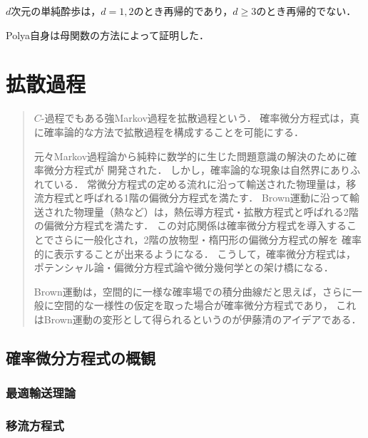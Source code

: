 \documentclass[uplatex,dvipdfmx]{jsreport}
\begin{document}
\begin{theorem}[Polya 1921]
    $d$次元の単純酔歩は，$d=1,2$のとき再帰的であり，$d\ge3$のとき再帰的でない．
\end{theorem}
\begin{history}
    Polya自身は母関数の方法によって証明した．
\end{history}

\chapter{拡散過程}

\begin{quotation}
    $C$-過程でもある強Markov過程を拡散過程という．
    確率微分方程式は，真に確率論的な方法で拡散過程を構成することを可能にする．

    元々Markov過程論から純粋に数学的に生じた問題意識の解決のために確率微分方程式が
    開発された．
    しかし，確率論的な現象は自然界にありふれている．
    常微分方程式の定める流れに沿って輸送された物理量は，移流方程式と呼ばれる1階の偏微分方程式を満たす．
    Brown運動に沿って輸送された物理量（熱など）は，熱伝導方程式・拡散方程式と呼ばれる2階の偏微分方程式を満たす．
    この対応関係は確率微分方程式を導入することでさらに一般化され，2階の放物型・楕円形の偏微分方程式の解を
    確率的に表示することが出来るようになる．
    こうして，確率微分方程式は，ポテンシャル論・偏微分方程式論や微分幾何学との架け橋になる．

    Brown運動は，空間的に一様な確率場での積分曲線だと思えば，さらに一般に空間的な一様性の仮定を取った場合が確率微分方程式であり，
    これはBrown運動の変形として得られるというのが伊藤清のアイデアである．
\end{quotation}

\section{確率微分方程式の概観}

\subsection{最適輸送理論}

\begin{definition}
    
\end{definition}

\subsection{移流方程式}
\end{document}
